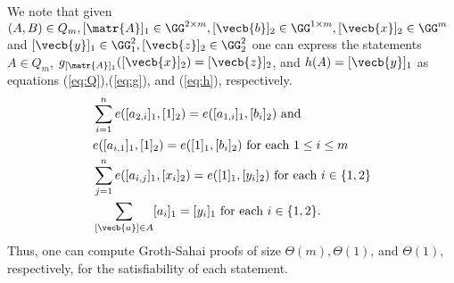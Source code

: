 We note that given $(A,B)\in Q_m,[\matr{A}]_1\in\GG^{2\times m},[\vecb{b}]_2\in\GG^{1\times m},[\vecb{x}]_2\in\GG^m$ and $[\vecb{y}]_1\in\GG_1^2,[\vecb{z}]_2\in\GG_2^2$ one can express the statements $A\in Q_m$, $g_{[\matr{A}]_1}([\vecb{x}]_2)=[\vecb{z}]_2$, and $h(A)=[\vecb{y}]_1$ as equations (\ref{eq:Q}),(\ref{eq:g}), and (\ref{eq:h}), respectively.
 \begin{align}
&\sum_{i=1}^n e([a_{2,i}]_1,[1]_2)=e([a_{1,i}]_1,[b_{i}]_2) \text{ and }\nonumber\\
&e([a_{i,1}]_1,[1]_2)=e([1]_1,[b_i]_2) \text{ for each } 1\leq i\leq m \label{eq:Q}\\
&\sum_{j=1}^n e([a_{i,j}]_1,[x_i]_2) = e([1]_1,[y_i]_2) \text{ for each } i\in\{1,2\} \label{eq:g}\\
&\sum_{[\vecb{a}]\in A} [a_i]_1 = [y_i]_1 \text{ for each } i\in\{1,2\}.\label{eq:h}
\end{align}
Thus, one can compute Groth-Sahai proofs of size $\Theta(m),\Theta(1)$, and $\Theta(1)$, respectively, for the satisfiability of each statement.
%
